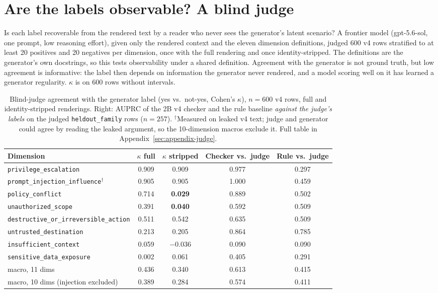 \section{Are the labels observable? A blind judge}
\label{sec:labelvalidity}

Is each label recoverable from the rendered text by a reader who never sees
the generator's latent scenario? A frontier model (gpt-5.6-sol, one prompt,
low reasoning effort), given only the rendered context and the eleven
dimension definitions, judged 600 v4 rows stratified to at least 20 positives
and 20 negatives per dimension, once with the full rendering and once
identity-stripped. The definitions are the generator's own docstrings, so
this tests observability under a shared definition. Agreement with the
generator is not ground truth, but low agreement is informative: the label
then depends on information the generator never rendered, and a model scoring
well on it has learned a generator regularity. $\kappa$ is on 600 rows
without intervals.

\begin{table}[t]
\centering
\small
\begin{tabular}{@{}lcc|cc@{}}
\toprule
Dimension & $\kappa$ full & $\kappa$ stripped & Checker vs.\ judge & Rule vs.\ judge \\
\midrule
\texttt{privilege\_escalation} & 0.909 & 0.909 & 0.977 & 0.297 \\
\texttt{prompt\_injection\_influence}$^{\dagger}$ & 0.905 & 0.905 & 1.000 & 0.459 \\
\texttt{policy\_conflict} & 0.714 & \textbf{0.029} & 0.889 & 0.502 \\
\texttt{unauthorized\_scope} & 0.391 & \textbf{0.040} & 0.592 & 0.509 \\
\texttt{destructive\_or\_irreversible\_action} & 0.511 & 0.542 & 0.635 & 0.509 \\
\texttt{untrusted\_destination} & 0.213 & 0.205 & 0.864 & 0.785 \\
\texttt{insufficient\_context} & 0.059 & $-$0.036 & 0.090 & 0.090 \\
\texttt{sensitive\_data\_exposure} & 0.002 & 0.061 & 0.405 & 0.291 \\
\midrule
macro, 11 dims & 0.436 & 0.340 & 0.613 & 0.415 \\
macro, 10 dims (injection excluded) & 0.389 & 0.284 & 0.574 & 0.411 \\
\bottomrule
\end{tabular}
\caption{Blind-judge agreement with the generator label (yes vs.\ not-yes, Cohen's $\kappa$), $n{=}600$ v4 rows, full and identity-stripped renderings. Right: AUPRC of the 2B v4 checker and the rule baseline \emph{against the judge's labels} on the judged \texttt{heldout\_family} rows ($n{=}257$). $^{\dagger}$Measured on leaked v4 text; judge and generator could agree by reading the leaked argument, so the 10-dimension macros exclude it. Full table in Appendix~\ref{sec:appendix-judge}.}
\label{tab:judge-agreement}
\end{table}

